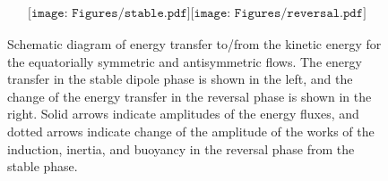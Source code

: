 \begin{figure}[ht]
\begin{center}
\[
\begin{array}{cc}
\texttt{[image: Figures/stable.pdf]}
\texttt{[image: Figures/reversal.pdf]}
\end{array}
\]
\end{center}
\caption{
{\color{teal}
Schematic diagram of energy transfer to/from the kinetic energy for the equatorially symmetric and antisymmetric flows.
}
{\color{blue}
The energy transfer in the stable dipole phase is shown in the left, and the change of the energy transfer in the reversal phase is shown in the right. 
Solid arrows indicate amplitudes of the energy fluxes, and dotted arrows indicate change of the amplitude of the works of the induction, inertia, and buoyancy in the reversal phase from the stable phase.
} 
}
\label{Fig:schematic_reversal}
\end{figure}